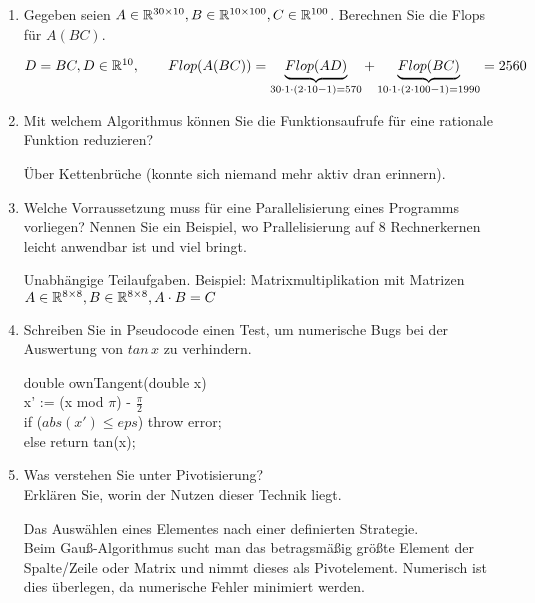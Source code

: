 \documentclass[12pt]{article}
\begin{document}
\begin{enumerate}

	\item Gegeben seien $A\in \mathbb{R}^{30\times 10}, B\in \mathbb{R}^{10\times 100}, C\in \mathbb{R}^{100}$. Berechnen Sie die Flops für $A(BC)$.
	\begin{solution}
		$D = BC, D\in \mathbb{R}^{10},\qquad Flop(A(BC)) = \underbrace{Flop(AD)}_{30\cdot 1\cdot (2\cdot 10 - 1) = 570} + \underbrace{Flop(BC)}_{10\cdot 1\cdot (2\cdot 100 - 1) = 1990} = 2560$
	\end{solution}
	
	\item Mit welchem Algorithmus können Sie die Funktionsaufrufe für eine rationale Funktion reduzieren?
	\begin{solution}
		Über Kettenbrüche (konnte sich niemand mehr aktiv dran erinnern).
	\end{solution}
	
	\item Welche Vorraussetzung muss für eine Parallelisierung eines Programms vorliegen? Nennen Sie ein Beispiel, wo Prallelisierung auf 8 Rechnerkernen leicht anwendbar ist und viel bringt.
	\begin{solution}
	Unabhängige Teilaufgaben. Beispiel: Matrixmultiplikation mit Matrizen $A\in \mathbb{R}^{8\times 8}, B\in \mathbb{R}^{8\times 8}, A\cdot B = C$
	\end{solution}
	
	\item Schreiben Sie in Pseudocode einen Test, um numerische Bugs bei der Auswertung von $tan\,x$ zu verhindern.
	\begin{solution}
		double ownTangent(double x)\\
			\indentTab x' := (x mod $\pi$) - $\frac{\pi}{2}$\\
			\indentTab if ($abs(x') \leq eps$) throw error;\\
			\indentTab else return tan(x);\\
	\end{solution}
	
	\item Was verstehen Sie unter Pivotisierung?\\
	Erklären Sie, worin der Nutzen dieser Technik liegt.

	\begin{solution}
		Das Auswählen eines Elementes nach einer definierten Strategie.\\
		Beim Gauß-Algorithmus sucht man das betragsmäßig größte Element der\\ Spalte/Zeile oder Matrix und nimmt dieses als Pivotelement. Numerisch ist dies überlegen, da numerische Fehler minimiert werden.
	\end{solution}	
	

\end{enumerate}
\end{document}
